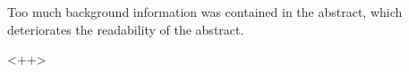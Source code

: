 \documentclass[answers,11pt]{exam}
\begin{document}
\begin{questions}
        \question  Too much background information was contained in the 
        abstract, which deteriorates the readability of the abstract.
        \begin{solution}
                <++>
        \end{solution}

\end{questions}


\end{document}
